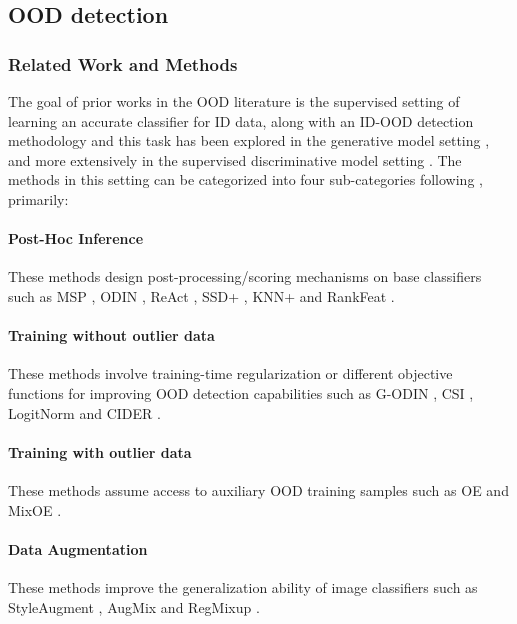 \subsection{OOD detection}
\label{app:sec_ood_detection}

\subsubsection{Related Work and Methods}
\label{app:ood_citations}
The goal of prior works in the OOD literature is the supervised setting of learning an accurate classifier for ID data, along with an ID-OOD detection methodology and this task has been explored in the generative model setting \citep{kirichenko2020normalizing,nalisnick2019deep,ren2019likelihood,serra2019input,xiao2020likelihood}, and more extensively in the supervised discriminative model setting \citep{openmax16cvpr,hendrycks2016baseline,hsu2020generalized,huang2021mos,liang2018enhancing,liu2020energy,sun2021tone,ming22a}. The methods in this setting can be categorized into four sub-categories following \citep{zhang2023openood}, primarily:

\paragraph{Post-Hoc Inference} These methods design post-processing/scoring mechanisms on base classifiers such as MSP \citep{hendrycks2016baseline}, ODIN \citep{liang2018enhancing}, ReAct \citep{sun2021tone}, SSD+ \citep{2021ssd}, KNN+ \citep{sun2022knnood} and RankFeat \citep{song2022rankfeat}. 
\paragraph{Training without outlier data} These methods involve training-time regularization or different objective functions for improving OOD detection capabilities such as G-ODIN \citep{hsu2020generalized}, CSI \citep{tack2020csi}, LogitNorm \citep{wei2022mitigating} and CIDER \citep{cider2022ming}. 

\paragraph{Training with outlier data} These methods assume access to auxiliary OOD training samples such as OE \citep{oe18nips} and MixOE \citep{mixoe23wacv}. 

\paragraph{Data Augmentation} These methods improve the generalization ability of image classifiers such as StyleAugment \citep{geirhos2018imagenettrained}, AugMix \citep{hendrycks2020augmix} and RegMixup \citep{pinto2022using}. \\

